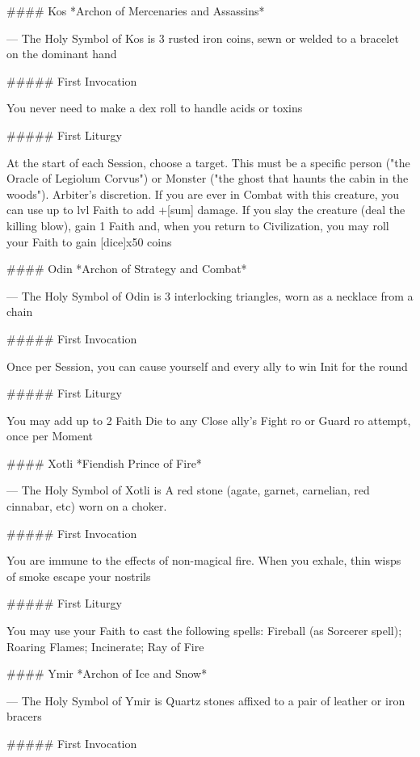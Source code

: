 #### Kos
*Archon of Mercenaries and Assassins*

---
The Holy Symbol of Kos is 3 rusted iron coins, sewn or welded to a bracelet on the dominant hand

##### First Invocation

You never need to make a {dex} roll to handle acids or toxins

##### First Liturgy

At the start of each Session, choose a target.  This must be a specific person ("the Oracle of Legiolum Corvus") or Monster ("the ghost that haunts the cabin in the woods").  Arbiter's discretion. If you are ever in Combat with this creature, you can use up to {lvl} Faith to add +[sum] damage.  If you slay the creature (deal the killing blow), gain 1 Faith and, when you return to Civilization, you may roll your Faith to gain [dice]x50 coins




#### Odin
*Archon of Strategy and Combat*

---
The Holy Symbol of Odin is 3 interlocking triangles, worn as a necklace from a chain

##### First Invocation

Once per Session, you can cause yourself and every ally to win Init for the round

##### First Liturgy

You may add up to 2 Faith Die to any Close ally's Fight {ro} or Guard {ro} attempt, once per Moment






#### Xotli
*Fiendish Prince of Fire*

---
The Holy Symbol of Xotli is A red stone (agate, garnet, carnelian, red cinnabar, etc) worn on a choker.

##### First Invocation

You are immune to the effects of non-magical fire. When you exhale, thin wisps of smoke escape your nostrils

##### First Liturgy

You may use your Faith to cast the following spells: Fireball (as Sorcerer spell); Roaring Flames; Incinerate; Ray of Fire




#### Ymir
*Archon of Ice and Snow*

---
The Holy Symbol of Ymir is Quartz stones affixed to a pair of leather or iron bracers

##### First Invocation


